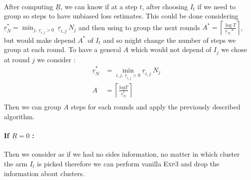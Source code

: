 \documentclass[11pt,a4paper]{article}
\begin{document}
\paragraph{}After computing $\underline{R}$, we can know if at a step $t$, after choosing $I_t$ if we need to group so steps to have unbiased loss estimates. This could be done considering $\underline{r}_N^{*}=\min_{j,\ \underline{r}_{i,j}>0}\ \underline{r}_{i,j}\:N_j$ and then using to group the next rounds $A^{*} =\left\lceil \frac{\log T}{\underline{r}_N^{}*} \right\rceil$, but would make depend $A^{*}$ of $I_t$ and so might change the number of steps we group at each round. To have a general $A$ which would not depend of $I_j$ we chose at round $j$ we consider :
\begin{align*}
\underline{r}_N^* &= \min_{i,j,\ \underline{r}_{i,j}>0} \underline{r}_{i,j}\:N_j\\
A &= \left\lceil \frac{log T}{\underline{r}_N^{*}} \right\rceil\\
\end{align*}
Then we can group $A$ steps for each rounds and apply the previously described algorithm.

\paragraph{If $\underline{R}=0$ : \\}
Then we consider as if we had no sides information, no matter in which cluster the arm $I_t$ is picked therefore we can perform vanilla \textsc{Exp3} and drop the information about clusters.
\end{document}
